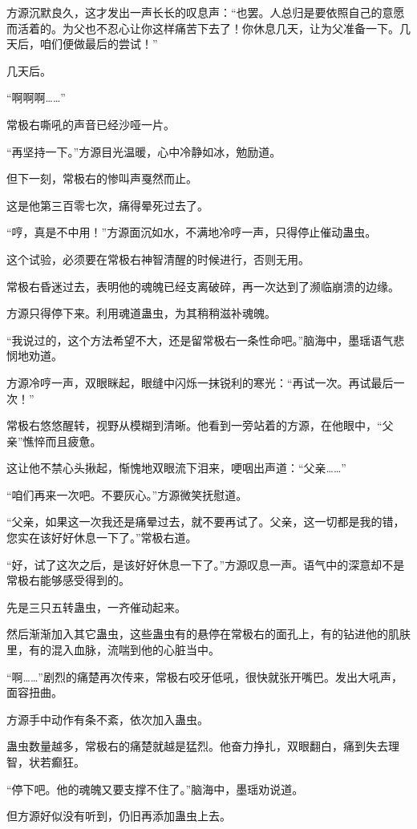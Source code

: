 \begin{this_body}
方源沉默良久，这才发出一声长长的叹息声：“也罢。人总归是要依照自己的意愿而活着的。为父也不忍心让你这样痛苦下去了！你休息几天，让为父准备一下。几天后，咱们便做最后的尝试！”

几天后。

“啊啊啊……”

常极右嘶吼的声音已经沙哑一片。

“再坚持一下。”方源目光温暖，心中冷静如冰，勉励道。

但下一刻，常极右的惨叫声戛然而止。

这是他第三百零七次，痛得晕死过去了。

“哼，真是不中用！”方源面沉如水，不满地冷哼一声，只得停止催动蛊虫。

这个试验，必须要在常极右神智清醒的时候进行，否则无用。

常极右昏迷过去，表明他的魂魄已经支离破碎，再一次达到了濒临崩溃的边缘。

方源只得停下来。利用魂道蛊虫，为其稍稍滋补魂魄。

“我说过的，这个方法希望不大，还是留常极右一条性命吧。”脑海中，墨瑶语气悲悯地劝道。

方源冷哼一声，双眼眯起，眼缝中闪烁一抹锐利的寒光：“再试一次。再试最后一次！”

常极右悠悠醒转，视野从模糊到清晰。他看到一旁站着的方源，在他眼中，“父亲”憔悴而且疲惫。

这让他不禁心头揪起，惭愧地双眼流下泪来，哽咽出声道：“父亲……”

“咱们再来一次吧。不要灰心。”方源微笑抚慰道。

“父亲，如果这一次我还是痛晕过去，就不要再试了。父亲，这一切都是我的错，您实在该好好休息一下了。”常极右道。

“好，试了这次之后，是该好好休息一下了。”方源叹息一声。语气中的深意却不是常极右能够感受得到的。

先是三只五转蛊虫，一齐催动起来。

然后渐渐加入其它蛊虫，这些蛊虫有的悬停在常极右的面孔上，有的钻进他的肌肤里，有的混入血脉，流喘到他的心脏当中。

“啊……”剧烈的痛楚再次传来，常极右咬牙低吼，很快就张开嘴巴。发出大吼声，面容扭曲。

方源手中动作有条不紊，依次加入蛊虫。

蛊虫数量越多，常极右的痛楚就越是猛烈。他奋力挣扎，双眼翻白，痛到失去理智，状若癫狂。

“停下吧。他的魂魄又要支撑不住了。”脑海中，墨瑶劝说道。

但方源好似没有听到，仍旧再添加蛊虫上去。


\end{this_body}
